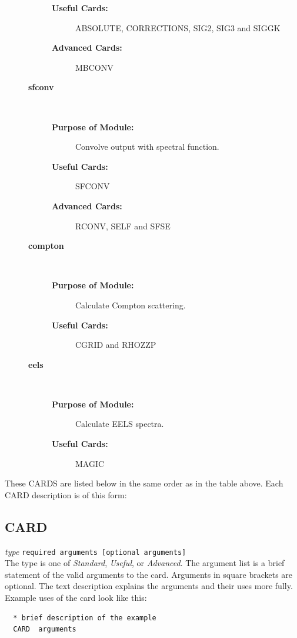 \documentclass[11pt,oneside]{report} %
\renewcommand{\htmlref}[2]{\hyperlink{#2}{#1}}
\newenvironment{Card}[4]%
      {\vspace{3ex}%
        \subsection{#1}
        \quad\textsl{#3}\newline
        \quad\texttt{#2}\newline%
        \label{card:#4}\\}
      {}
\newcommand{\module}[1]{\textrm{\bf{#1}}}
\renewcommand{\htmlref}[2]{{#1}} %
\begin{document}
\begin{description}
\begin{description}
\begin{description}
  \item[\textbf{Useful Cards:}] \htmlref{ABSOLUTE}{card:abs},
  \htmlref{CORRECTIONS}{card:cor},
    \htmlref{SIG2}{card:sig}, \htmlref{SIG3}{card:si3} and
    \htmlref{SIGGK}{card:siggk}
  \item[\textbf{Advanced Cards:}] \htmlref{MBCONV}{card:mbc}
  \end{description}
\item[{\large\module{sfconv}}]\dotfill\ 
  \begin{description}
  \item[\textbf{Purpose of Module:}] Convolve output with spectral function. 
  \item[\textbf{Useful Cards:}] \htmlref{SFCONV}{card:scc}
  \item[\textbf{Advanced Cards:}]     \htmlref{RCONV}{card:rco},
    \htmlref{SELF}{card:sel} and
    \htmlref{SFSE}{card:sfs}
  \end{description}
\item[{\large\module{compton}}]\dotfill\ 
  \begin{description}
  \item[\textbf{Purpose of Module:}] Calculate Compton scattering. 
  \item[\textbf{Useful Cards:}] \htmlref{CGRID}{card:cgr} and
    \htmlref{RHOZZP}{card:rho}
  \end{description}  
\item[{\large\module{eels}}]\dotfill\ 
  \begin{description}
  \item[\textbf{Purpose of Module:}] Calculate EELS spectra. 
  \item[\textbf{Useful Cards:}] \htmlref{MAGIC}{card:mag}
  \end{description}




  \end{description}

\end{description}


These CARDS are listed below in the same order as in the table above.
Each CARD description is of this form:

\begin{Card}{CARD}{required arguments [optional arguments]}{type}{}
  The type is one of \textsl{Standard}, \textsl{Useful}, or
  \textsl{Advanced}. The argument list is a brief statement of the
  valid arguments to the card. Arguments in square brackets are 
  optional. The text description explains the arguments and 
  their uses more fully. Example uses of the card look like this:
\begin{verbatim}
  * brief description of the example
  CARD  arguments
\end{verbatim}
\end{Card}
\end{document}
